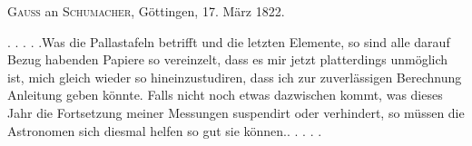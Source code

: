 \par{}\bigskip
\begin{center}
\textsc{Gauss} an \textsc{Schumacher}, Göttingen, 17. März 1822.
\end{center}
\noindent\hspace*{\parindent}. . . . .\quad Was die Pallastafeln betrifft und die letzten Elemente, so sind alle darauf Bezug habenden Papiere so vereinzelt, dass es mir jetzt platterdings unmöglich ist, mich gleich wieder so hineinzustudiren, dass ich zur zuverlässigen Berechnung Anleitung geben könnte. Falls nicht noch etwas dazwischen kommt, was dieses Jahr die Fortsetzung meiner Messungen suspendirt oder verhindert, so müssen die Astronomen sich diesmal helfen so gut sie können.\quad . . . . .
\par
